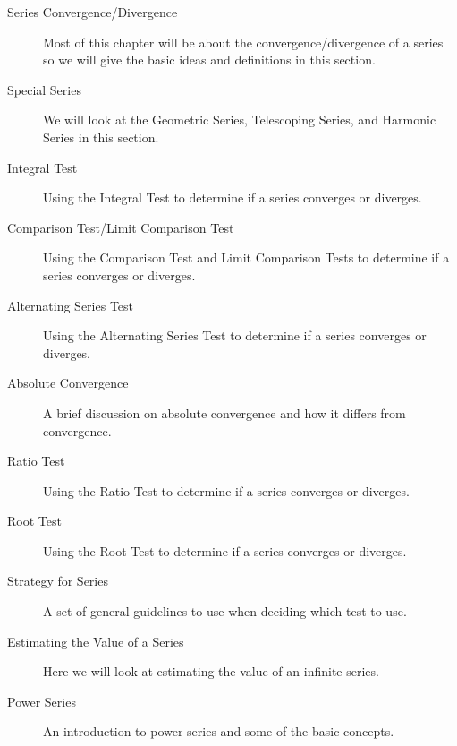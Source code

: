 \documentclass[]{report}
\begin{document}

	
	\begin{description}
		\item[Series Convergence/Divergence]  Most of this chapter will be about the convergence/divergence of a series so we will give the basic ideas and definitions in this section.
 
\item[Special Series]  We will look at the Geometric Series, Telescoping Series, and Harmonic Series in this section.
 
\item[Integral Test]  Using the Integral Test to determine if a series converges or diverges.
\end{description}

\medskip
	
	\begin{description}
\item[Comparison Test/Limit Comparison Test]  Using the Comparison Test and Limit Comparison Tests to determine if a series converges or diverges.
 
\item[Alternating Series Test]  Using the Alternating Series Test to determine if a series converges or diverges.
 
\item[Absolute Convergence]  A brief discussion on absolute convergence and how it differs from convergence.
 
\item[Ratio Test]  Using the Ratio Test to determine if a series converges or diverges.
\end{description}

\medskip
	
\begin{description}
\item[Root Test]  Using the Root Test to determine if a series converges or diverges.
 
\item[Strategy for Series]  A set of general guidelines to use when deciding which test to use.
 
\item[Estimating the Value of a Series]  Here we will look at estimating the value of an infinite series.
 
\item[Power Series]  An introduction to power series and some of the basic concepts.

\end{description}
\end{document}
